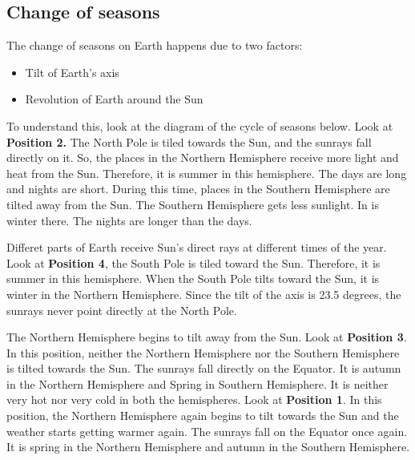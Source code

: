 \subsection{\textbf{Change of seasons}}
The change of seasons on Earth happens due to two factors:
\vspace{0.1in}
\begin{itemize}
    \item Tilt of Earth's axis
    \item Revolution of Earth around the Sun
\end{itemize}
\par
\vspace{0.1in}
To understand this, look at the diagram of the cycle of seasons below.
\vspace{0.54in}
Look at \textbf{Position 2.} The North Pole is tiled towards the Sun, and the sunrays fall directly on it. So, the places in the Northern Hemisphere receive more light and heat from the Sun. Therefore, it is summer in this hemisphere. The days are long and nights are short. During this time, places in the Southern Hemisphere are tilted away from the Sun. The Southern Hemisphere gets less sunlight. In is winter there. The nights are longer than the days.
\vspace{0.1in}
\par
Differet parts of Earth receive Sun's direct rays at different times of the year. Look at \textbf{Position 4}, the South Pole is tiled toward the Sun. Therefore, it is summer in this hemisphere. When the South Pole tilts toward the Sun, it is winter in the Northern Hemisphere. Since the tilt of the axis is 23.5 degrees, the sunrays never point directly at the North Pole.
\vspace{0.1in}
\par
The Northern Hemisphere begins to tilt away from the Sun. Look at \textbf{Position 3}. In this position, neither the Northern Hemisphere nor the Southern Hemisphere is tilted towards the Sun. The sunrays fall directly on the Equator. It is autumn in the Northern Hemisphere and Spring in Southern Hemisphere. It is neither very hot nor very cold in both the hemispheres.
\vspace{0.1in}
Look at \textbf{Position 1}. In this position, the Northern Hemisphere again begins to tilt towards the Sun and the weather starts getting warmer again. The sunrays fall on the Equator once again. It is spring in the Northern Hemisphere and autumn in the Southern Hemisphere.
\vspace{0.34in}
